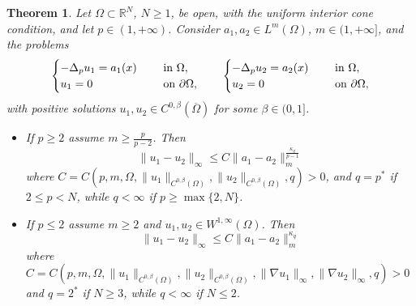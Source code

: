 \documentclass[11pt, reqno]{amsart}
\newtheorem{theorem}[lemma]{Theorem}
\theoremstyle{definition}
\numberwithin{equation}{section}
\newcommand{\R}{\mathbb{R}}
\def\norm#1{\|#1\|}
\begin{document}
\begin{theorem}
\label{thm_compar_1}
Let $\Omega \subset \R^N$, $N \geq 1$, be open, with the uniform interior cone condition, and let $p \in (1,+\infty)$. 
Consider $a_1, a_2 \in L^{m}(\Omega)$, $m \in (1,+\infty]$, and the problems
\begin{equation}\label{eq_confron_a1_a2}
\begin{cases}
-\Delta_p u_1 = a_1(x) & \quad \hbox{ in $\Omega$},\\ 
u_1 =0 & \quad \hbox{ on $\partial \Omega$},
\end{cases}
\qquad
\begin{cases}
-\Delta_p u_2 = a_2(x) & \quad \hbox{ in $\Omega$},\\ 
u_2 =0 & \quad \hbox{ on $\partial \Omega$},
\end{cases}
\end{equation}
with positive solutions $u_1, u_2 \in C^{0,\beta}(\overline{\Omega})$ for some $\beta \in (0,1]$. 
\begin{itemize}
\item If $p \geq 2$ assume $m \geq \frac{p}{p-2}$. 
Then 
$$\norm{u_1-u_2}_{\infty} \leq C \norm{a_1 -a_2}_{m}^{\frac{\kappa_{q}}{p-1}}$$
where $C=C(p, m, \Omega, \norm{u_1}_{C^{0,\beta}(\Omega)}, \norm{u_2}_{C^{0,\beta}(\Omega)}, q)>0$, and $q=p^*$ if $2 \leq p<N$, while $q<\infty$ if $p\geq \max\{2,N\}$.
\item If $p \leq 2$ assume $m \geq 2$ and $u_1, u_2 \in W^{1,\infty}(\Omega)$. 
Then
$$\norm{u_1 - u_2}_{\infty} \leq C \norm{a_1 -a_2}_{m}^{\kappa_{q}} $$
where $C=C(p, m, \Omega, \norm{u_1}_{C^{0,\beta}(\Omega)}, \norm{u_2}_{C^{0,\beta}(\Omega)}, \norm{\nabla u_1}_{\infty}, \norm{\nabla u_2}_{\infty}, q)>0$ and $q=2^*$ if $N\geq 3$, while $q <\infty$ if $N\leq 2$.
\end{itemize}
\end{theorem}
\end{document}
